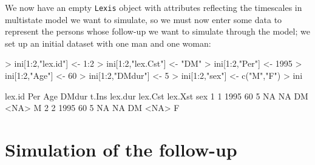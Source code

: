 \documentclass[a4paper,twoside,12pt]{report}
\begin{document}
We now have an empty \texttt{Lexis} object with attributes reflecting
the timescales in multistate model we want to simulate, so we must now
enter some data to represent the persons whose follow-up we want to
simulate through the model; we set up an initial dataset with one man
and one woman:
\begin{Schunk}
\begin{Sinput}
> ini[1:2,"lex.id"] <- 1:2
> ini[1:2,"lex.Cst"] <- "DM"
> ini[1:2,"Per"] <- 1995
> ini[1:2,"Age"] <- 60
> ini[1:2,"DMdur"] <- 5
> ini[1:2,"sex"] <- c("M","F")
> ini
\end{Sinput}
\begin{Soutput}
  lex.id  Per Age DMdur t.Ins lex.dur lex.Cst lex.Xst sex
1      1 1995  60     5    NA      NA      DM    <NA>   M
2      2 1995  60     5    NA      NA      DM    <NA>   F
\end{Soutput}
\end{Schunk}

\section{Simulation of the follow-up}
\end{document}
